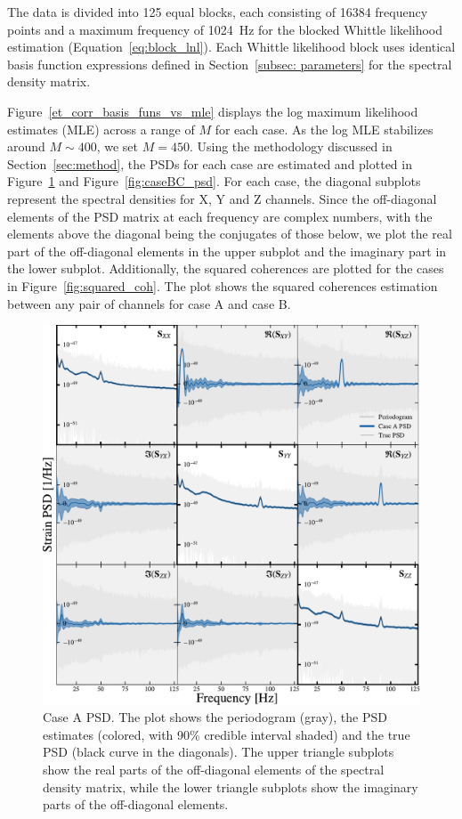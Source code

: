 \documentclass[%
 reprint,
 amsmath,amssymb,
 aps,
 nofootinbib,
]{revtex4-2}
\begin{document}
The data is divided into 125 equal blocks, each consisting of \num{16 384} frequency points and a maximum frequency of \SI{1024}{Hz} for the blocked Whittle likelihood estimation (Equation~\ref{eq:block_lnl}). 
Each Whittle likelihood block uses identical basis function expressions defined in Section~\ref{subsec: parameters} for the spectral density matrix. 

Figure~\ref{et_corr_basis_funs_vs_mle} displays the log maximum
likelihood estimates (MLE) across a range of $M$ for each case.
As the log MLE stabilizes around $M\sim400$, we set $M=450$.
Using the methodology discussed in Section~\ref{sec:method}, the PSDs for each case are estimated and plotted in Figure~\ref{fig:caseA_psd} and Figure~\ref{fig:caseBC_psd}. For each case, the diagonal subplots represent the spectral densities for X, Y and Z channels. Since the off-diagonal elements of the PSD matrix at each frequency are complex numbers, with the elements above the diagonal being the conjugates of those below, we plot the real part of the off-diagonal elements in the upper subplot and the imaginary part in the lower subplot.
Additionally, the squared coherences are plotted for the cases in Figure~\ref{fig:squared_coh}. The plot shows the squared coherences estimation between any pair of channels for case A and case B.


\begin{figure}
\centering
\includegraphics[width=\textwidth]{caseA_psd.pdf}
\caption{Case A PSD. The plot shows the periodogram (gray), the PSD estimates (colored, with 90\% credible interval shaded) and the true PSD (black curve in the diagonals). The upper triangle subplots show the real parts of the off-diagonal elements of the spectral density matrix, while the lower triangle subplots show the imaginary parts of the off-diagonal elements.}
\label{fig:caseA_psd}
\end{figure}
\end{document}
